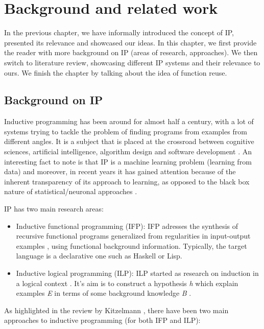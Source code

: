 \chapter{Background and related work}

\indent In the previous chapter, we have informally introduced the concept of IP, presented its relevance and showcased our ideas. In this chapter, we first provide the reader with more background on IP (areas of research, approaches). We then switch to literature review, showcasing different IP systems and their relevance to ours. We finish the chapter by talking about the idea of function reuse.

\section{Background on IP}
\indent \indent Inductive programming has been around for almost half a century, with a lot of systems trying to tackle the problem of finding programs from examples from different angles. It is a subject that is placed at the crossroad between cognitive sciences, artificial intelligence, algorithm design and software development \cite{kitzelmannsurvey}. An interesting fact to note is that IP is a machine learning problem (learning from data) and moreover, in recent years it has gained attention because of the inherent transparency of its approach to learning, as opposed to the black box nature of statistical/neuronal approaches \cite{SchmidInductivePA}.
\par IP has two main research areas:
\begin{itemize}
\item Inductive functional programming (IFP): IFP adresses the synthesis of recursive functional programs generalized from regularities in input-output examples \cite{gulwanietal}, using functional background information. Typically, the target language is a declarative one such as Haskell or Lisp.
\item Inductive logical programming (ILP): ILP started as research on induction in a logical context \cite{gulwanietal}. It's aim is to construct a hypothesis \textit{h} which explain examples \textit{E} in terms of some background knowledge \textit{B} \cite{MUGGLETON1999283}.
\end{itemize}
\par As highlighted in the review by Kitzelmann \cite{kitzelmannsurvey}, there have been two main approaches to inductive programming (for both IFP and ILP):
